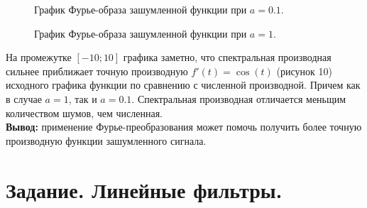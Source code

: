 \documentclass[a5paper, 10pt]{article}
\theoremstyle{definition}
\theoremstyle{plain}
\theoremstyle{remark}
\begin{document}
\begin{figure}[h!]
\caption{График Фурье-образа зашумленной функции при $a=0.1$.}
\caption{График Фурье-образа зашумленной функции при $a=1$.}
\end{figure}


На промежутке $[-10; 10]$ графика заметно, что спектральная производная сильнее приближает точную производную $f'(t) = \cos(t)$ (рисунок 10) исходного графика функции по сравнению с численной производной. Причем как в случае $a=1$, так и $a=0.1$. Спектральная производная отличается меньщим количеством шумов, чем численная.\\
\textbf{Вывод:} применение Фурье-преобразования может помочь получить более точную производную функции зашумленного сигнала.






\newpage
\section{Задание. Линейные фильтры.}
\end{document}

